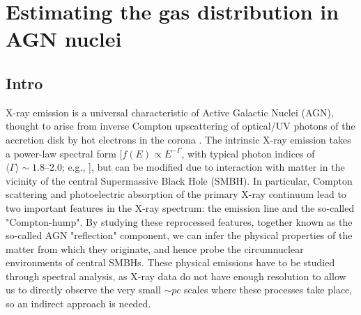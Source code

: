 
\chapter{Estimating the gas distribution in AGN nuclei} \label{ch:gas_distribution}



\section{Intro}
X-ray emission is a universal characteristic of Active Galactic Nuclei (AGN), thought to arise from inverse Compton upscattering of optical/UV photons of the accretion disk by hot electrons in the corona  \citep[e.g.,][]{1991ApJ...380L..51H}. The intrinsic X-ray emission takes a power-law spectral form  [$f(E){\propto}E^{-\Gamma}$, with  typical photon indices of ${\langle}\Gamma{\rangle}{\sim}1.8$--$2.0$; e.g., \citealt{1994MNRAS.268..405N, 2009ApJ...690.1322W, 2011A&A...530A..42C}], but can be modified due to interaction with matter in the vicinity of the central Supermassive Black Hole (SMBH). In particular, Compton scattering and photoelectric absorption of the primary X-ray continuum lead to two important features in the X-ray spectrum: the \kalfa{} emission line and the so-called "Compton-hump". By studying these reprocessed features, together known as the so-called AGN "reflection" component, we can infer the physical properties of the matter from which they originate, and hence probe the circumnuclear environments of central SMBHs. These physical emissions have to be studied through spectral analysis, as X-ray data do not have enough resolution to allow us to directly observe the very small $\sim pc$ scales where these processes take place, so an indirect approach is needed.


